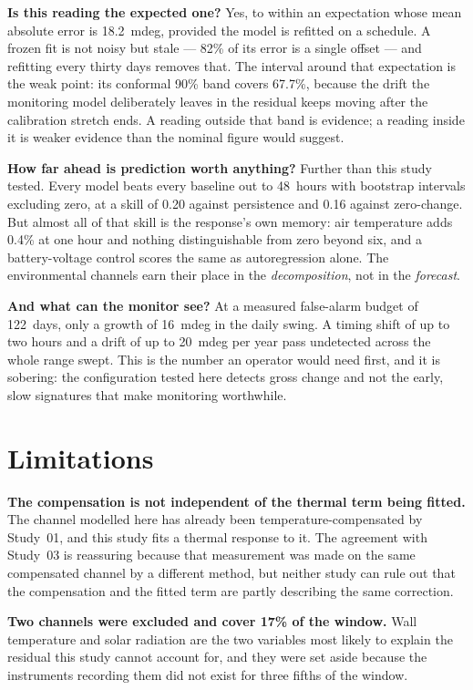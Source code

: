 \documentclass[11pt,a4paper]{article}
\begin{document}
\textbf{Is this reading the expected one?} Yes, to within an expectation whose
mean absolute error is 18.2~mdeg, provided the model is refitted on a schedule.
A frozen fit is not noisy but stale --- 82\% of its error is a single offset ---
and refitting every thirty days removes that. The interval around that
expectation is the weak point: its conformal 90\% band covers 67.7\%, because
the drift the monitoring model deliberately leaves in the residual keeps moving
after the calibration stretch ends. A reading outside that band is evidence; a
reading inside it is weaker evidence than the nominal figure would suggest.

\textbf{How far ahead is prediction worth anything?} Further than this study
tested. Every model beats every baseline out to 48~hours with bootstrap
intervals excluding zero, at a skill of 0.20 against persistence and 0.16
against zero-change. But almost all of that skill is the response's own memory:
air temperature adds 0.4\% at one hour and nothing distinguishable from zero
beyond six, and a battery-voltage control scores the same as autoregression
alone. The environmental channels earn their place in the \emph{decomposition},
not in the \emph{forecast}.

\textbf{And what can the monitor see?} At a measured false-alarm budget of
122~days, only a growth of 16~mdeg in the daily swing. A timing shift of up to
two hours and a drift of up to 20~mdeg per year pass undetected across the whole
range swept. This is the number an operator would need first, and it is
sobering: the configuration tested here detects gross change and not the early,
slow signatures that make monitoring worthwhile.

\section{Limitations}
\label{sec:limitations}

\textbf{The compensation is not independent of the thermal term being fitted.}
The channel modelled here has already been temperature-compensated by Study~01,
and this study fits a thermal response to it. The agreement with Study~03 is
reassuring because that measurement was made on the same compensated channel by
a different method, but neither study can rule out that the compensation and the
fitted term are partly describing the same correction.

\textbf{Two channels were excluded and cover 17\% of the window.} Wall
temperature and solar radiation are the two variables most likely to explain the
residual this study cannot account for, and they were set aside because the
instruments recording them did not exist for three fifths of the window.
\end{document}
